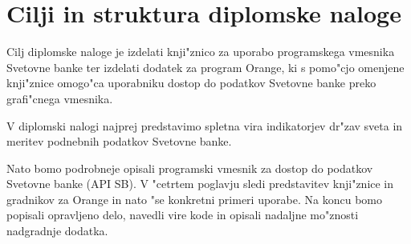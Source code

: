 \section{Cilji in struktura diplomske naloge}

Cilj diplomske naloge je izdelati knji"znico za uporabo programskega vmesnika
Svetovne banke ter izdelati dodatek za program Orange, ki s pomo"cjo omenjene
knji"znice omogo"ca uporabniku dostop do podatkov Svetovne banke preko
grafi"cnega vmesnika.


V diplomski nalogi najprej predstavimo spletna vira indikatorjev
dr"zav sveta in meritev podnebnih podatkov Svetovne banke.

Nato bomo podrobneje opisali programski vmesnik za dostop do
podatkov Svetovne banke (API SB). V "cetrtem poglavju sledi predstavitev
knji"znice in gradnikov za Orange in nato "se konkretni primeri uporabe. Na koncu
bomo popisali opravljeno delo, navedli vire kode in opisali nadaljne mo"znosti
nadgradnje dodatka.














